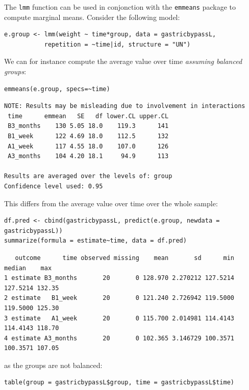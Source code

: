 \documentclass[12pt]{article}
\begin{document}
The \texttt{lmm} function can be used in conjonction with the \texttt{emmeans}
package to compute marginal means. Consider the following model:
\lstset{language=r,label= ,caption= ,captionpos=b,numbers=none}
\begin{lstlisting}
e.group <- lmm(weight ~ time*group, data = gastricbypassL,
	       repetition = ~time|id, structure = "UN")
\end{lstlisting}

We can for instance compute the average value over time \emph{assuming balanced groups}:
\lstset{language=r,label= ,caption= ,captionpos=b,numbers=none}
\begin{lstlisting}
emmeans(e.group, specs=~time)
\end{lstlisting}

\begin{verbatim}
NOTE: Results may be misleading due to involvement in interactions
 time      emmean   SE   df lower.CL upper.CL
 B3_months    130 5.05 18.0    119.3      141
 B1_week      122 4.69 18.0    112.5      132
 A1_week      117 4.55 18.0    107.0      126
 A3_months    104 4.20 18.1     94.9      113

Results are averaged over the levels of: group 
Confidence level used: 0.95
\end{verbatim}


This differs from the average value over time over the whole sample:
\lstset{language=r,label= ,caption= ,captionpos=b,numbers=none}
\begin{lstlisting}
df.pred <- cbind(gastricbypassL, predict(e.group, newdata = gastricbypassL))
summarize(formula = estimate~time, data = df.pred)
\end{lstlisting}

\begin{verbatim}
   outcome      time observed missing    mean       sd      min   median    max
1 estimate B3_months       20       0 128.970 2.270212 127.5214 127.5214 132.35
2 estimate   B1_week       20       0 121.240 2.726942 119.5000 119.5000 125.30
3 estimate   A1_week       20       0 115.700 2.014981 114.4143 114.4143 118.70
4 estimate A3_months       20       0 102.365 3.146729 100.3571 100.3571 107.05
\end{verbatim}


as the groups are not balanced:
\lstset{language=r,label= ,caption= ,captionpos=b,numbers=none}
\begin{lstlisting}
table(group = gastricbypassL$group, time = gastricbypassL$time)
\end{lstlisting}
\end{document}
